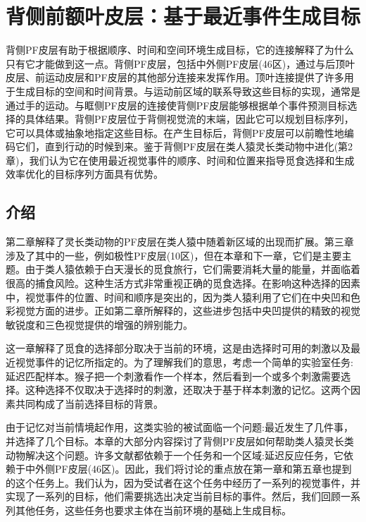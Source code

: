 \chapter{背侧前额叶皮层：基于最近事件生成目标}
背侧PF皮层有助于根据顺序、时间和空间环境生成目标，它的连接解释了为什么只有它才能做到这一点。背侧PF皮层，包括中外侧PF皮层(46区)，通过与后顶叶皮层、前运动皮层和PF皮层的其他部分连接来发挥作用。顶叶连接提供了许多用于生成目标的空间和时间背景。与运动前区域的联系导致这些目标的实现，通常是通过手的运动。与眶侧PF皮层的连接使背侧PF皮层能够根据单个事件预测目标选择的具体结果。背侧PF皮层位于背侧视觉流的末端，因此它可以规划目标序列，它可以具体或抽象地指定这些目标。在产生目标后，背侧PF皮层可以前瞻性地编码它们，直到行动的时候到来。鉴于背侧PF皮层在类人猿灵长类动物中进化(第2章)，我们认为它在使用最近视觉事件的顺序、时间和位置来指导觅食选择和生成效率优化的目标序列方面具有优势。

\section{介绍}
第二章解释了灵长类动物的PF皮层在类人猿中随着新区域的出现而扩展。第三章涉及了其中的一些，例如极性PF皮层(10区)，但在本章和下一章，它们是主要主题。由于类人猿依赖于白天漫长的觅食旅行，它们需要消耗大量的能量，并面临着很高的捕食风险。这种生活方式非常重视正确的觅食选择。在影响这种选择的因素中，视觉事件的位置、时间和顺序是突出的，因为类人猿利用了它们在中央凹和色彩视觉方面的进步。正如第二章所解释的，这些进步包括中央凹提供的精致的视觉敏锐度和三色视觉提供的增强的辨别能力。

这一章解释了觅食的选择部分取决于当前的环境，这是由选择时可用的刺激以及最近视觉事件的记忆所指定的。为了理解我们的意思，考虑一个简单的实验室任务:延迟匹配样本。猴子把一个刺激看作一个样本，然后看到一个或多个刺激需要选择。这种选择不仅取决于选择时的刺激，还取决于基于样本刺激的记忆。这两个因素共同构成了当前选择目标的背景。

由于记忆对当前情境起作用，这类实验的被试面临一个问题:最近发生了几件事，并选择了几个目标。本章的大部分内容探讨了背侧PF皮层如何帮助类人猿灵长类动物解决这个问题。许多文献都依赖于一个任务和一个区域:延迟反应任务，它依赖于中外侧PF皮层(46区)。因此，我们将讨论的重点放在第一章和第五章也提到的这个任务上。我们认为，因为受试者在这个任务中经历了一系列的视觉事件，并实现了一系列的目标，他们需要挑选出决定当前目标的事件。然后，我们回顾一系列其他任务，这些任务也要求主体在当前环境的基础上生成目标。

